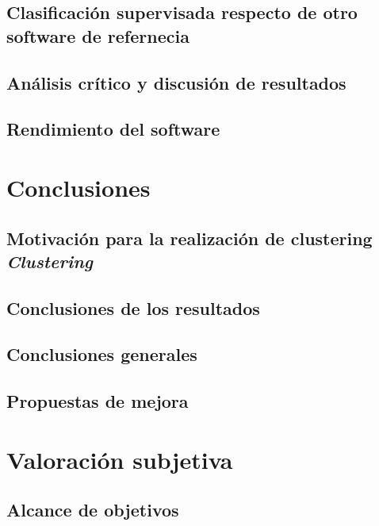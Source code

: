 \documentclass[a4paper]{report}
\begin{document}
	\section{Clasificación supervisada respecto de otro software de refernecia}
	
	\section{Análisis crítico y discusión de resultados}
	
	\section{Rendimiento del software}

\chapter{Conclusiones}

	\section{Motivación para la realización de clustering \textit{Clustering}}
	
	\section{Conclusiones de los resultados}
	
	\section{Conclusiones generales}
	
	\section{Propuestas de mejora}


\newpage




\chapter{Valoración subjetiva}
	
	\section*{Alcance de objetivos}
	
\end{document}
